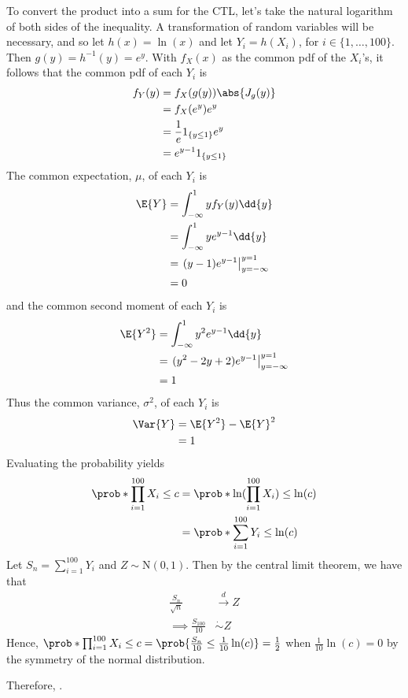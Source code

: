 \documentclass[%
  hwnumber=8,%
  studentnumber=20053722,%
  {name=Bryan Hoang}%
]{%
  mthe353answer%
}
\begin{document}
  \begin{questions}
    \setcounter{question}{3}
    \question{}
    \begin{solution}
      To convert the product into a sum for the CTL, let's take the natural
      logarithm of both sides of the inequality. A transformation of random
      variables will be necessary, and so let \(h(x) = \ln(x)\) and let \(Y_i = h(X_i)\),
      for \(i \in \{1, \dotsc, 100\}\). Then \(g(y) = h^{-1}(y) = e^y\). With \(f_X(x)\)
      as the common pdf of the \(X_i\)'s, it follows that the common pdf of each
      \(Y_i\) is
      \begin{align*}
        f_Y(y) &= f_X(g(y))\abs{J_g(y)}\\
        &= f_X(e^y) e^y\\
        &= \frac{1}{e} 1_{\{y \le 1\}} e^y\\
        &= e^{y-1} 1_{\{y \le 1\}}
      \end{align*}
      The common expectation, \(\mu\), of each \(Y_i\) is
      \begin{align*}
        \E{Y} &= \int_{-\infty}^{1} y f_Y(y) \dd{y}\\
        &= \int_{-\infty}^{1} y e^{y-1} \dd{y}\\
        &= \left.(y-1)e^{y-1}\right|_{y = -\infty}^{y = 1}\\
        &= 0
      \end{align*}
      and the common second moment of each \(Y_i\) is
      \begin{align*}
        \E{Y^2} &= \int_{-\infty}^{1} y^2 e^{y-1} \dd{y}\\
        &= \left.(y^2-2y+2)e^{y-1}\right|_{y=-\infty}^{y=1}\\
        &= 1
      \end{align*}
      Thus the common variance, \(\sigma^2\), of each \(Y_i\) is
      \begin{align*}
        \Var{Y} &= \E{Y^2} - \E{Y}^2\\
        &= 1
      \end{align*}
      Evaluating the probability yields
      \begin{align*}
        \prob*{\prod_{i=1}^{100} X_i \le c} &= \prob*{\ln(\prod_{i=1}^{100} X_i) \le \ln(c)}\\
        &= \prob*{\sum_{i=1}^{100} Y_i \le \ln(c)}
      \end{align*}
      Let \(S_n = \sum_{i=1}^{100} Y_i\) and \(Z \sim \text{N}(0,1)\). Then by
      the central limit theorem, we have that
      \begin{align*}
        \frac{S_n}{\sqrt{n}} &\xrightarrow{d} Z\\
        \implies \frac{S_{100}}{10} &\dot{\sim} Z
      \end{align*}
      Hence, \(\prob*{\prod_{i=1}^{100} X_i \le c} = \prob{\frac{S_n}{10} \le \frac{1}{10}\ln(c)} = \frac{1}{2}\)
      when \(\frac{1}{10}\ln(c) = 0\) by the symmetry of the normal distribution.

      Therefore, .
    \end{solution}
  \end{questions}
\end{document}

